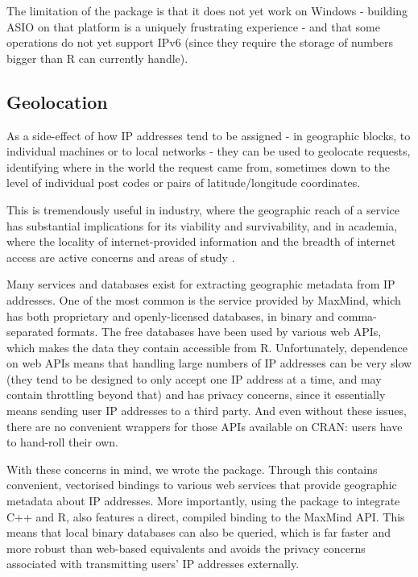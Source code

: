 The limitation of the package is that it does not yet work on Windows -
building ASIO on that platform is a uniquely frustrating experience -
and that some operations do not yet support IPv6 (since they require the
storage of numbers bigger than R can currently handle).

\subsection{Geolocation}\label{geolocation}

As a side-effect of how IP addresses tend to be assigned - in geographic
blocks, to individual machines or to local networks - they can be used
to geolocate requests, identifying where in the world the request came
from, sometimes down to the level of individual post codes or pairs of
latitude/longitude coordinates.

This is tremendously useful in industry, where the geographic reach of a
service has substantial implications for its viability and
survivability, and in academia, where the locality of internet-provided
information and the breadth of internet access are active concerns and
areas of study \citep{barriers}.

Many services and databases exist for extracting geographic metadata
from IP addresses. One of the most common is the service provided by
MaxMind, which has both proprietary and openly-licensed databases, in
binary and comma-separated formats. The free databases have been used by
various web APIs, which makes the data they contain accessible from R.
Unfortunately, dependence on web APIs means that handling large numbers
of IP addresses can be very slow (they tend to be designed to only
accept one IP address at a time, and may contain throttling beyond that)
and has privacy concerns, since it essentially means sending user IP
addresses to a third party. And even without these issues, there are no
convenient wrappers for those APIs available on CRAN: users have to
hand-roll their own.

With these concerns in mind, we wrote the  package.
Through  this contains convenient, vectorised bindings to
various web services that provide geographic metadata about IP
addresses. More importantly, using the  package to
integrate C++ and R,  also features a direct, compiled
binding to the MaxMind API. This means that local binary databases can
also be queried, which is far faster and more robust than web-based
equivalents and avoids the privacy concerns associated with transmitting
users' IP addresses externally.

